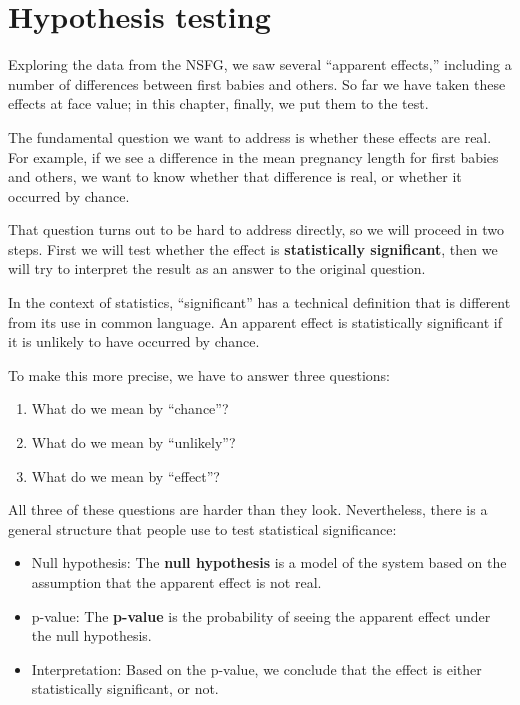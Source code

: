 \documentclass[12pt]{book}
\begin{document}
\chapter{Hypothesis testing}
\label{testing}

Exploring the data from the NSFG, we saw several ``apparent effects,''
including a number of differences between first babies and others.
So far we have taken these effects at face value; in this chapter,
finally, we put them to the test.

The fundamental question we want to address is whether these effects
are real.  For example, if we see a difference in the mean pregnancy
length for first babies and others, we want to know whether that
difference is real, or whether it occurred by chance.

That question turns out to be hard to address directly, so we will
proceed in two steps.  First we will test whether the effect is {\bf
statistically significant}, then we will try to interpret the result
  as an answer to the original question.

In the context of statistics, ``significant'' has a technical
definition that is different from its use in common language.
An apparent effect is statistically
significant if it is unlikely to have occurred by chance.

To make this more precise, we have to answer three questions:

\begin{enumerate}

\item What do we mean by ``chance''?

\item What do we mean by ``unlikely''?

\item What do we mean by ``effect''?

\end{enumerate}

All three of these questions are harder than they look.  Nevertheless,
there is a general structure that people use to test statistical
significance:

\begin{itemize}

\item Null hypothesis: The {\bf null hypothesis} is a model of the
  system based on the assumption that the apparent effect is not real.

\item p-value: The {\bf p-value} is the probability of seeing the apparent
  effect under the null hypothesis.

\item Interpretation: Based on the p-value, we conclude that the
  effect is either statistically significant, or not.

\end{itemize}
\end{document}
